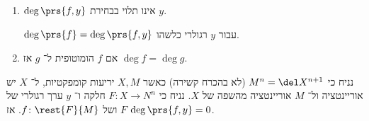 \documentclass[a4paper,10pt,twoside,openany]{book}
\begin{document}
\begin{theorem} \label{map degree: theorem}
\begin{enumerate}
\item $\deg\prs{f,y}$
אינו תלוי בבחירת
$y$.

\begin{definition}
$\deg \prs{f} = \deg\prs{f,y}$
עבור
$y$
רגולרי כלשהו.
\end{definition}

\item אם
$f$
הומוטופית ל־%
$g$
אז
$\deg f = \deg g$.
\end{enumerate}
\end{theorem}

\begin{lemma}\label{map degree: lemma 1}
נניח כי
$M^n = \del X^{n+1}$ (לא בהכרח קשירה)
כאשר
$X,M$
יריעות קומפקטיות, ל־%
$X$
יש אוריינטציה ול־%
$M$
אוריינטציה מהשפה של
$X$.
נניח כי
$F \colon X \to N^n$
חלקה ו־%
$y$
ערך רגולרי של
$F$
ושל
$f \colon \rest{F}{M}$.
אז
$\deg\prs{f,y} = 0$.
\end{lemma}
\end{document}
